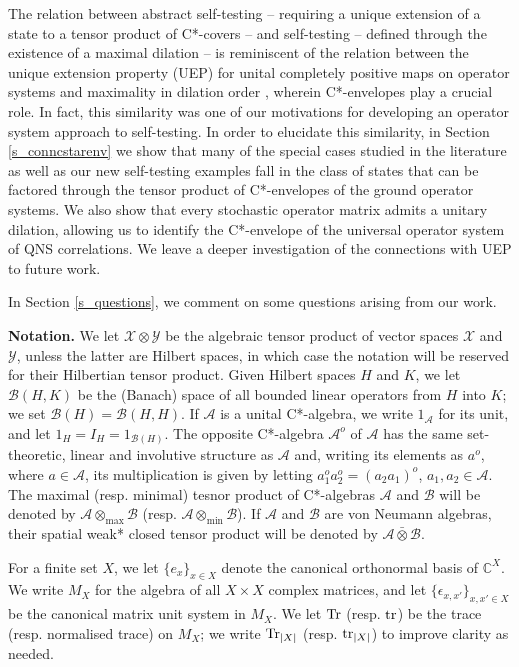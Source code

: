\documentclass[11pt]{amsart}
\theoremstyle{definition}
\newcommand{\cl}[1]{\mathcal{#1}}
\newcommand{\bb}[1]{\mathbb{#1}}
\begin{document}
The relation between abstract self-testing -- requiring a unique extension of a state to a tensor product of C*-covers -- and self-testing -- defined through the existence of a maximal dilation -- is reminiscent of the relation between the unique extension property (UEP) for unital completely positive maps on operator systems and maximality in dilation order \cite{arv}, wherein C*-envelopes play a crucial role. In fact, this similarity was one of our motivations for developing an operator system approach to self-testing. In order to elucidate this similarity, in Section \ref{s_conncstarenv} we show that many of the special 
cases studied in the literature as well as our new self-testing examples fall in the class of states 
that can be factored through the tensor product of C*-envelopes of the 
ground operator systems. We also show that every stochastic operator 
matrix admits a unitary dilation, allowing us to identify the 
C*-envelope of the universal operator system of QNS correlations. We leave a deeper investigation of the connections with UEP to future work.

In Section \ref{s_questions}, we comment on some questions 
arising from our work. 

\medskip

\noindent 
{\bf Notation.} 
We let $\cl X\otimes \cl Y$ be the algebraic tensor product of
vector spaces $\cl X$ and $\cl Y$, unless the latter are Hilbert spaces, 
in which case the notation will be reserved for their Hilbertian tensor product. 
Given Hilbert spaces $H$ and $K$, we let $\cl B(H,K)$ be the 
(Banach) space of all bounded linear operators from $H$ into $K$; 
we set $\cl B(H) = \cl B(H,H)$. 
If $\cl{A}$ is a unital C*-algebra, we write $1_\cl{A}$ for its unit, and let 
$1_H = I_H = 1_{\cl B(H)}$. 
The opposite C*-algebra $\cl{A}^o$ of $\cl{A}$ has the same 
set-theoretic, linear and involutive structure as $\cl{A}$ and, writing its elements as $a^o$, where $a\in \cl{A}$, its multiplication is 
given by letting $a_1^o a_2^o = (a_2 a_1)^o$, $a_1,a_2\in \cl{A}$. 
The maximal (resp. minimal) tesnor product of C*-algebras $\cl{A}$ and 
$\cl{B}$ will be denoted by $\cl{A} \otimes_{\max} \cl{B}$
(resp. $\cl{A} \otimes_{\min} \cl{B}$). If $\cl{A}$ and $\cl{B}$ are von Neumann algebras, 
their spatial weak* closed tensor product will be denoted by 
$\cl{A}\bar\otimes \cl{B}$. 

For a finite set $X$, we let $\{e_x\}_{x\in X}$ denote the canonical 
orthonormal basis of $\bb{C}^X$. We write $M_X$ for the algebra of all 
$X\times X$ complex matrices, and let $\{\epsilon_{x,x'}\}_{x,x'\in X}$
be the canonical matrix unit system in $M_X$. We let ${\rm Tr}$ 
(resp. ${\rm tr}$) be the trace (resp. normalised trace) on $M_X$; we write 
${\rm Tr}_{|X|}$ (resp. ${\rm tr}_{|X|}$) 
to improve clarity as needed. 
\end{document}
